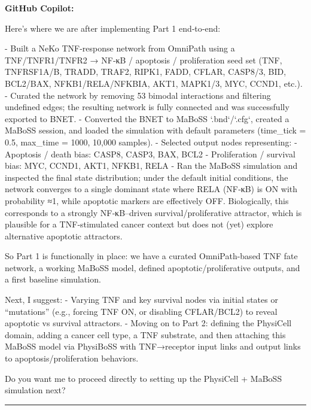 \documentclass[11pt,a4paper]{article}
\begin{document}
\begin{copilotbox}
\textbf{GitHub Copilot:}

Here’s where we are after implementing Part 1 end‑to‑end:

- Built a NeKo TNF-response network from OmniPath using a TNF/TNFR1/TNFR2 → NF‑κB / apoptosis / proliferation seed set (TNF, TNFRSF1A/B, TRADD, TRAF2, RIPK1, FADD, CFLAR, CASP8/3, BID, BCL2/BAX, NFKB1/RELA/NFKBIA, AKT1, MAPK1/3, MYC, CCND1, etc.).
- Curated the network by removing 53 bimodal interactions and filtering undefined edges; the resulting network is fully connected and was successfully exported to BNET.
- Converted the BNET to MaBoSS `.bnd`/`.cfg`, created a MaBoSS session, and loaded the simulation with default parameters (time\_tick = 0.5, max\_time = 1000, 10,000 samples).
- Selected output nodes representing:
  - Apoptosis / death bias: CASP8, CASP3, BAX, BCL2
  - Proliferation / survival bias: MYC, CCND1, AKT1, NFKB1, RELA
- Ran the MaBoSS simulation and inspected the final state distribution; under the default initial conditions, the network converges to a single dominant state where RELA (NF‑κB) is ON with probability ≈1, while apoptotic markers are effectively OFF. Biologically, this corresponds to a strongly NF‑κB–driven survival/proliferative attractor, which is plausible for a TNF‑stimulated cancer context but does not (yet) explore alternative apoptotic attractors.

So Part 1 is functionally in place: we have a curated OmniPath-based TNF fate network, a working MaBoSS model, defined apoptotic/proliferative outputs, and a first baseline simulation.

Next, I suggest:
- Varying TNF and key survival nodes via initial states or “mutations” (e.g., forcing TNF ON, or disabling CFLAR/BCL2) to reveal apoptotic vs survival attractors.
- Moving on to Part 2: defining the PhysiCell domain, adding a cancer cell type, a TNF substrate, and then attaching this MaBoSS model via PhysiBoSS with TNF→receptor input links and output links to apoptosis/proliferation behaviors.

Do you want me to proceed directly to setting up the PhysiCell + MaBoSS simulation next?

\end{copilotbox}
\bigskip\hrule\bigskip
\end{document}
